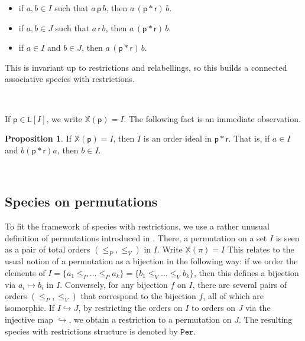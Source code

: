 \documentclass[12pt, reqno]{amsart}
\theoremstyle{definition}
\newtheorem{prop}[thm]{Proposition}
\begin{document}
\begin{itemize}
\item if $a, b \in I$ such that $a \, \mathsf{p} \, b$, then $a \, (\mathsf{p} \ast \mathsf{r}) \, b$.

\item if $a, b \in J$ such that $a \, \mathsf{r} \, b$, then $a \, (\mathsf{p} \ast \mathsf{r}) \, b$.

\item if $a \in I$ and $b \in J$, then $a \, (\mathsf{p} \ast \mathsf{r}) \, b$.
\end{itemize}
This is invariant up to restrictions and relabellings, so this builds a connected associative species with restrictions. 

\

If $\mathsf{p} \in \mathtt{L}[I]$, we write $\mathbb{X}(\mathsf{p}) = I$.
The following fact is an immediate observation.

\begin{prop}\label{prop:linorderideals}
If $\mathbb{X}(\mathsf{p}) = I$, then $I$ is an order ideal in $\mathsf{p} \ast \mathsf{r}$.
That is, if $a\in I$ and $b (\mathsf{p} \ast \mathsf{r}) a$, then $b\in I$.
\end{prop}

\

\subsection{Species on permutations\label{sec:speciespermutation}}

To fit the framework of species with restrictions, we use a rather unusual definition of permutations introduced in \cite{albert2020two}.
There, a permutation on a set $I$ is seen as a pair of total orders $(\leq_P, \leq_V)$ in $I$.
Write $\mathbb{X}(\pi) = I$
This relates to the usual notion of a permutation as a bijection in the following way: if we order the elements of $I = \{a_1 \leq_P \dots \leq_P a_k \} = \{ b_1 \leq_V \dots \leq_V b_k \}$, then this defines a bijection via $a_i \mapsto b_i $ in $I$.
Conversely, for any bijection $f$ on $I$, there are several pairs of orders $(\leq_P, \leq_V)$ that correspond to the bijection $f$, all of which are isomorphic.
If $I \hookrightarrow J$, by restricting the orders on $I$ to orders on $J$ via the injective map $\hookrightarrow $, we obtain a restriction to a permutation on $J$.
The resulting species with restrictions structure is denoted by $\mathtt{Per}$.

\
\end{document}
